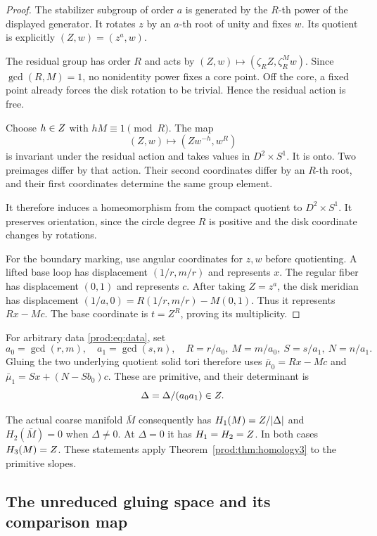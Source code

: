\begin{proof}
The stabilizer subgroup of order $a$ is generated by the $R$-th power
of the displayed generator.  It rotates $z$ by an $a$-th root of unity
and fixes $w$.  Its quotient is explicitly $(Z,w)=(z^a,w)$.

The residual group has order $R$ and acts by
$(Z,w)\mapsto(\zeta_RZ,\zeta_R^M w)$.
Since $\gcd(R,M)=1$, no nonidentity power fixes a core point.
Off the core, a fixed point already forces the disk rotation to be
trivial.  Hence the residual action is free.

Choose $h\in Z$ with $hM\equiv1\pmod R$.
The map
\[
                  (Z,w)\longmapsto (Zw^{-h},w^R)
\]
is invariant under the residual action and takes values in $D^2\times S^1$.
It is onto.  Two preimages differ by that action. Their second coordinates differ by
an $R$-th root, and their first coordinates determine the same group element.

It therefore induces a homeomorphism from the
compact quotient to $D^2\times S^1$.
It preserves orientation, since the circle degree $R$ is positive and
the disk coordinate changes by rotations.

For the boundary marking, use angular coordinates for $z,w$ before
quotienting.  A lifted base loop has displacement $(1/r,m/r)$ and
represents $x$.  The regular fiber has displacement $(0,1)$ and
represents $c$.  After taking $Z=z^a$, the disk meridian has displacement
$(1/a,0)=R(1/r,m/r)-M(0,1)$.
Thus it represents $Rx-Mc$.
The base coordinate is $t=Z^R$, proving its multiplicity.
\end{proof}

For arbitrary data \eqref{prod:eq:data}, set
\begin{equation}\label{prod:eq:reduced-data}
 a_0=\gcd(r,m),\quad a_1=\gcd(s,n),\quad
 R=r/a_0,\ M=m/a_0,\ S=s/a_1,\ N=n/a_1.
\end{equation}
Gluing the two underlying quotient solid tori therefore uses
$\bar\mu_0=Rx-Mc$ and
$\bar\mu_1=Sx+(N-Sb_0)c$.
These are primitive, and their determinant is
\[
                 \Delta=\Delta/(a_0a_1)\in Z.
\]

The actual coarse manifold $\bar M$ consequently has
$H_1(M)=Z/|\Delta|$ and $H_2(\bar M)=0$ when
$\Delta\ne0$.  At $\Delta=0$ it has $H_1=H_2=Z$.
In both cases $H_3(M)=Z$.
These statements apply Theorem~\ref{prod:thm:homology3} to the primitive slopes.

\subsection{The unreduced gluing space and its comparison map}

